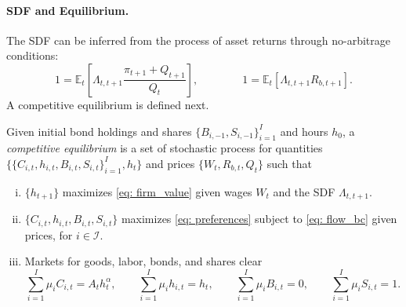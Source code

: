 \paragraph{SDF and Equilibrium.}
The SDF can be inferred from the process of asset returns through no-arbitrage conditions:
\begin{equation}\label{eq: no_arbitrage}
    1 = \mathbb{E}_t\left[ \Lambda_{t,t+1} \frac{\pi_{t+1}+Q_{t+1}}{Q_t}  \right], \qquad \qquad 
    1 = \mathbb{E}_t\left[ \Lambda_{t,t+1} R_{b,t+1}  \right].
\end{equation}
A competitive equilibrium is defined next.

\begin{definition}
Given initial bond holdings and shares  $\{B_{i,-1}, S_{i,-1}\}_{i=1}^I$ and hours $h_0$, a \textit{competitive equilibrium} is a set of stochastic process for quantities $\{\{C_{i,t}, h_{i,t}, B_{i,t}, S_{i,t}\}_{i=1}^I, h_t\}$ and prices $\{W_t, R_{b,t}, Q_t\}$ such that 
\begin{enumerate}[(i)]
    \item $\{h_{t+1}\}$ maximizes \eqref{eq: firm_value} given wages $W_t$ and the SDF $\Lambda_{t,t+1}$.
    \item $\{C_{i,t}, h_{i,t}, B_{i,t}, S_{i,t}\}$ maximizes \eqref{eq: preferences} subject to \eqref{eq: flow_bc}  given prices, for $i \in \mathcal{I}$. 
    \item Markets for goods, labor, bonds, and shares clear
    \begin{equation}
        \sum_{i=1}^I \mu_i C_{i,t} = A_t h_t^\alpha, \qquad 
        \sum_{i=1}^I \mu_i h_{i,t} = h_t, \qquad 
        \sum_{i=1}^I \mu_i B_{i,t} = 0, \qquad 
        \sum_{i=1}^I \mu_i S_{i,t} = 1.
    \end{equation}
\end{enumerate}
\end{definition}


